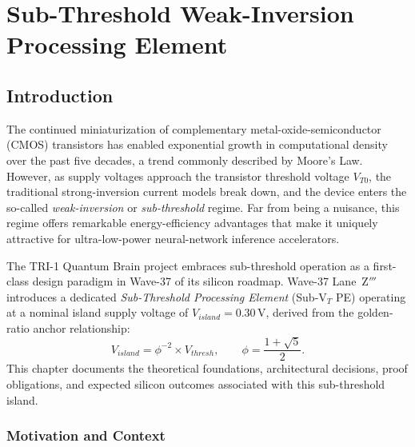 
\chapter{Sub-Threshold Weak-Inversion Processing Element}
\label{ch:subthreshold}

\section{Introduction}
\label{sec:intro}

The continued miniaturization of complementary metal-oxide-semiconductor (CMOS) transistors
has enabled exponential growth in computational density over the past five decades, a trend
commonly described by Moore's Law.  However, as supply voltages approach the transistor
threshold voltage $V_{T0}$, the traditional strong-inversion current models break down, and
the device enters the so-called \emph{weak-inversion} or \emph{sub-threshold} regime.
Far from being a nuisance, this regime offers remarkable energy-efficiency advantages that
make it uniquely attractive for ultra-low-power neural-network inference accelerators.

The TRI-1 Quantum Brain project embraces sub-threshold operation as a first-class design
paradigm in Wave-37 of its silicon roadmap.  Wave-37 Lane~Z$'''$ introduces a dedicated
\emph{Sub-Threshold Processing Element} (Sub-V$_T$ PE) operating at a nominal island supply
voltage of $V_{island} = 0.30\,\text{V}$, derived from the golden-ratio anchor relationship:
\[
  V_{island} = \phi^{-2} \times V_{thresh}, \qquad \phi = \frac{1+\sqrt{5}}{2}.
\]
This chapter documents the theoretical foundations, architectural decisions, proof obligations,
and expected silicon outcomes associated with this sub-threshold island.

\subsection{Motivation and Context}

